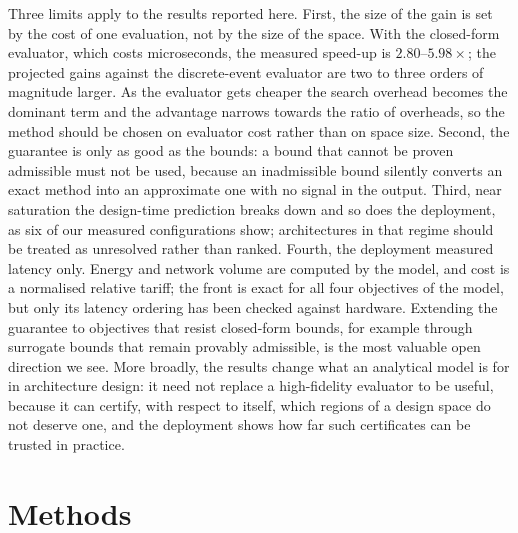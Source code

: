 \documentclass[pdflatex,sn-nature,lineno]{sn-jnl}
\newcommand{\AnalyticalSpeedup}{2.80\text{--}5.98}
\begin{document}
Three limits apply to the results reported here. First, the size of the gain is set by the cost of one evaluation, not by the size of the
space. With the closed-form evaluator, which costs microseconds, the measured speed-up is
$\AnalyticalSpeedup\times$; the projected gains against the discrete-event evaluator are two
to three orders of magnitude larger. As the evaluator gets cheaper the search overhead
becomes the dominant term and the advantage narrows towards the ratio of overheads, so
the method should be chosen on evaluator cost rather than on space size. Second, the
guarantee is only as good as the bounds: a bound that cannot be proven admissible must
not be used, because an inadmissible bound silently converts an exact method into an
approximate one with no signal in the output. Third, near saturation the design-time
prediction breaks down and so does the deployment, as six of our measured configurations
show; architectures in that regime should be treated as unresolved rather than ranked.
Fourth, the deployment measured latency only. Energy and network volume are computed by
the model, and cost is a normalised relative tariff; the front is exact for all four
objectives of the model, but only its latency ordering has been checked against hardware.
Extending the guarantee to objectives that resist closed-form bounds, for example through
surrogate bounds that remain provably admissible, is the most valuable open direction we
see. More broadly, the results change what an analytical model is for in architecture
design: it need not replace a high-fidelity evaluator to be useful, because it can
certify, with respect to itself, which regions of a design space do not deserve one, and
the deployment shows how far such certificates can be trusted in practice.
\section{Methods}
\label{sec:sn:methods}
\end{document}
